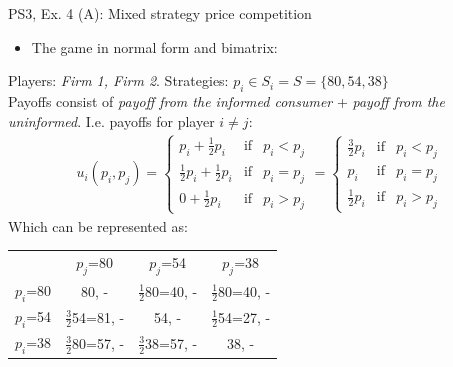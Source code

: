 \begin{frame}{PS3, Ex. 4 (A): Mixed strategy price competition}
    \begin{itemize}
      \item[(a)] The game in normal form and bimatrix:
    \end{itemize}
    Players: \textit{Firm 1, Firm 2}. Strategies: $p_i\in S_i = S = \{80, 54, 38\}$\\\medskip
    Payoffs consist of \textit{payoff from the informed consumer} + \textit{payoff from the uninformed}.
    I.e. payoffs for player $i\neq j$:
    \begin{align*}
      u_i(p_i,p_j)=
      \left\{ \begin{array}{rcl}
      p_i + \frac{1}{2}p_i & \mbox{if} & p_i < p_j \\
      \frac{1}{2}p_i + \frac{1}{2}p_i & \mbox{if} & p_i = p_j \\
      0 + \frac{1}{2}p_i & \mbox{if} & p_i > p_j
      \end{array}\right.
      =
      \left\{ \begin{array}{rcl}
      \frac{3}{2}p_i & \mbox{if} & p_i < p_j \\
                 p_i & \mbox{if} & p_i = p_j \\
      \frac{1}{2}p_i & \mbox{if} & p_i > p_j
      \end{array}\right.
    \end{align*}
    Which can be represented as:
      \vspace{-6pt}
      \begin{table}
        \begin{tabular}{c|c|c|c|}
          \multicolumn{1}{c}{} & \multicolumn{1}{c}{$p_j$=80} & \multicolumn{1}{c}{$p_j$=54} & \multicolumn{1}{c}{$p_j$=38} \\\cline{2-4}
          $p_i$=80 & 80, - & $\frac{1}{2}$80=40, - & $\frac{1}{2}$80=40, - \\\cline{2-4}
          $p_i$=54 & $\frac{3}{2}$54=81, - & 54, - & $\frac{1}{2}$54=27, - \\\cline{2-4}
          $p_i$=38 & $\frac{3}{2}$80=57, - & $\frac{3}{2}$38=57, - & 38, - \\\cline{2-4}
        \end{tabular}
      \end{table}
  \vfill\null
\end{frame}
